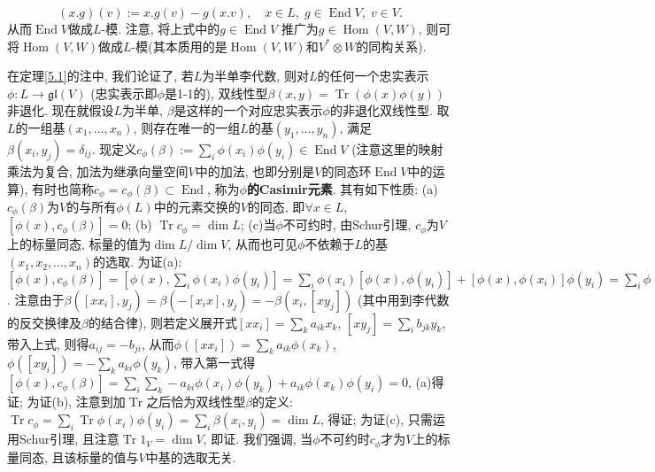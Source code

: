 \documentclass{ctexart}%
\theoremstyle{definition}
\theoremstyle{remark}
\DeclareMathOperator{\Tr}{Tr}
\DeclareMathOperator{\End}{End}
\DeclareMathOperator{\Hom}{Hom}
\begin{document}
\begin{itemize}
\begin{equation}\label{endv}
(x.g)(v):=x.g(v)-g(x.v),\quad x\in L,\; g\in \End V,\; v\in V.
\end{equation}
从而$\End V$做成$L$-模. 注意, 将上式中的$g\in \End V$ 推广为$g\in \Hom (V,W)$, 则可将$\Hom(V,W)$做成$L$-模(其本质用的是$\Hom(V,W)$和$V^*\otimes W$的同构关系). 
\end{itemize}

在定理\ref{5.1}的注中, 我们论证了, 若$L$为半单李代数, 则对$L$的任何一个忠实表示$\phi \colon L\rightarrow \mathfrak{gl}(V)$ (忠实表示即$\phi$是1-1的), 双线性型$\beta(x,y)=\Tr(\phi(x)\phi(y))$非退化. 现在就假设$L$为半单, $\beta$是这样的一个对应忠实表示$\phi$的非退化双线性型. 取$L$的一组基$(x_1,...,x_n)$, 则存在唯一的一组$L$的基$(y_1,...,y_n)$, 满足$\beta(x_i,y_j)=\delta_{ij}$. 现定义$c_\phi(\beta) := \sum_i \phi(x_i)\phi(y_i)\in \End V$ (注意这里的映射乘法为复合, 加法为继承向量空间$V$中的加法, 也即分别是$V$的同态环$\End V$中的运算), 有时也简称$c_\phi=c_\phi(\beta)\subset \End$, 称为\textbf{$\phi$的Casimir元素}. 其有如下性质: (a) $c_\phi(\beta)$为$V$的与所有$\phi(L)$中的元素交换的$V$的同态, 即$\forall x\in L$, $[\phi(x),c_\phi(\beta)]=0$; (b) $\Tr c_\phi = \dim L$; (c)当$\phi$不可约时, 由Schur引理, $c_\phi$为$V$上的标量同态, 标量的值为$\dim L/\dim V$, 从而也可见$\phi$不依赖于$L$的基$(x_1,x_2,...,x_n)$的选取. 为证(a): $[\phi(x),c_\phi(\beta)]=[\phi(x),\sum_i \phi(x_i)\phi(y_i)] = \sum_i \phi(x_i)[\phi(x),\phi(y_i)] + [\phi(x),\phi(x_i)]\phi(y_i)=\sum_i\phi(x_i)\phi([xy_i])+\phi([xx_i])\phi(y_i)$. 注意由于$\beta([xx_i],y_j)=\beta(-[x_ix],y_j)= -\beta(x_i,[xy_j])$ (其中用到李代数的反交换律及$\beta$的结合律), 则若定义展开式$[xx_i]=\sum_k a_{ik}x_k$, $[xy_j]=\sum_i b_{jk}y_k$, 带入上式, 则得$a_{ij}=-b_{ji}$, 从而$\phi([xx_i])=\sum_k a_{ik}\phi(x_k)$, $\phi([xy_i]) = -\sum_k a_{ki}\phi(y_k)$, 带入第一式得$[\phi(x),c_\phi(\beta)]=\sum_i\sum_k -a_{ki}\phi(x_i)\phi(y_k)+a_{ik}\phi(x_k)\phi(y_i)=0$, (a)得证; 为证(b), 注意到加$\Tr$之后恰为双线性型$\beta$的定义: $\Tr c_\phi = \sum_i \Tr \phi(x_i)\phi(y_i) = \sum_i \beta(x_i,y_i)= \dim L$, 得证; 为证(c), 只需运用Schur引理, 且注意$\Tr 1_V = \dim V$, 即证. 我们强调, 当$\phi$不可约时$c_\phi$才为$V$上的标量同态, 且该标量的值与$V$中基的选取无关. 
\end{document}
